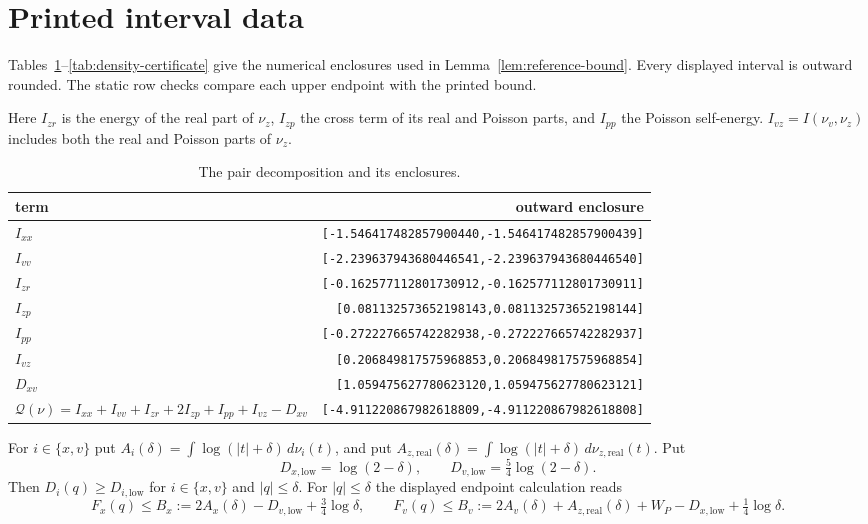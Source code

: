 \documentclass{amsart}
\numberwithin{equation}{section}
\numberwithin{table}{section}
\begin{document}
\section{Printed interval data}\label{app:printed-data}
Tables~\ref{tab:q-certificate}--\ref{tab:density-certificate} give the
numerical enclosures used in Lemma~\ref{lem:reference-bound}. Every displayed
interval is outward rounded. The static row checks compare each upper endpoint
with the printed bound.
\begin{table}[ht]
\centering\footnotesize\renewcommand{\arraystretch}{1.2}\setlength{\tabcolsep}{8pt}
\caption{The pair decomposition and its enclosures.}
\label{tab:q-certificate}
Here $I_{zr}$ is the energy of the real part of $\nu_z$, $I_{zp}$ the cross term
of its real and Poisson parts, and $I_{pp}$ the Poisson self-energy. $I_{vz}=I(\nu_v,\nu_z)$
includes both the real and Poisson parts of $\nu_z$.
\begin{tabular}{@{}lr@{}}
\hline term & outward enclosure\\\hline
$I_{xx}$ & \texttt{[-1.546417482857900440,-1.546417482857900439]}\\
$I_{vv}$ & \texttt{[-2.239637943680446541,-2.239637943680446540]}\\
$I_{zr}$ & \texttt{[-0.162577112801730912,-0.162577112801730911]}\\
$I_{zp}$ & \texttt{[0.081132573652198143,0.081132573652198144]}\\
$I_{pp}$ & \texttt{[-0.272227665742282938,-0.272227665742282937]}\\
$I_{vz}$ & \texttt{[0.206849817575968853,0.206849817575968854]}\\
$D_{xv}$ & \texttt{[1.059475627780623120,1.059475627780623121]}\\
$\mathcal{Q}(\nu)=I_{xx}+I_{vv}+I_{zr}+2I_{zp}+I_{pp}+I_{vz}-D_{xv}$ & \texttt{[-4.911220867982618809,-4.911220867982618808]}\\
\hline
\end{tabular}
\end{table}
For $i\in\{x,v\}$ put
$A_i(\delta)=\int\log(|t|+\delta)\,d\nu_i(t)$, and put
$A_{z,\mathrm{real}}(\delta)=\int\log(|t|+\delta)\,d\nu_{z,\mathrm{real}}(t)$.
Put
\[
 D_{x,\mathrm{low}}=\log(2-\delta),\qquad
 D_{v,\mathrm{low}}=\tfrac54\log(2-\delta).
\]
Then $D_i(q)\ge D_{i,\mathrm{low}}$ for $i\in\{x,v\}$ and
$|q|\le\delta$.
For $|q|\le\delta$ the displayed endpoint calculation reads
\[
F_x(q)\le B_x:=2A_x(\delta)-D_{v,\mathrm{low}}+\tfrac34\log\delta,\qquad
F_v(q)\le B_v:=2A_v(\delta)+A_{z,\mathrm{real}}(\delta)+W_P
          -D_{x,\mathrm{low}}+\tfrac14\log\delta.
\]
\end{document}
